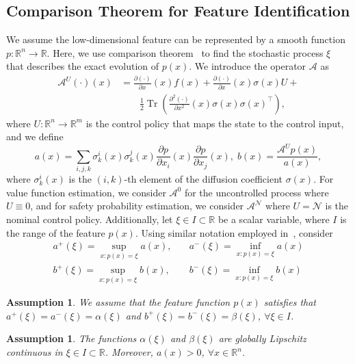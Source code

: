 \documentclass[letterpaper]{article} %
\newtheorem{assumption}[theorem]{Assumption}
\begin{document}
\subsection{Comparison Theorem for Feature Identification}
We assume the low-dimensional feature can be represented by a smooth function $p: \mathbb{R}^n \rightarrow \mathbb{R}$. Here, we use comparison theorem~\cite[Theorem 3.1]{ikeda1977comparison} to find the stochastic process $\xi$ that describes the exact evolution of $p(x)$.
We introduce the operator $\mathcal{A}$ as
\begin{equation}
\label{eq:def_L}
\begin{aligned}
\mathcal{A}^U(\cdot)(x) & =\frac{\partial(\cdot)}{\partial x}(x) f(x)+ \frac{\partial (\cdot)}{\partial x}(x) \sigma(x) U + \\
& \qquad \frac{1}{2} \operatorname{Tr}\left(\frac{\partial^2(\cdot)}{\partial x^2}(x) \sigma(x) \sigma(x)^\top\right),
\end{aligned}
\end{equation}
where $U: \mathbb{R}^n \rightarrow \mathbb{R}^m$ is the control policy that maps the state to the control input, and we define
\begin{equation}
    a(x)=\sum_{i, j, k} \sigma_k^i(x) \sigma_k^j(x) \frac{\partial p}{\partial x_i}(x) \frac{\partial p}{\partial x_j}(x), \; b(x)=\frac{\mathcal{A}^U p(x)}{a(x)},
\end{equation}
where $\sigma_k^i(x)$ is the $(i,k)$-th element of the diffusion coefficient $\sigma(x)$.
For value function estimation, we consider $\mathcal{A}^0$ for the uncontrolled process where $U \equiv 0$, and for safety probability estimation, we consider $\mathcal{A}^{\mathcal{N}}$ where $U = \mathcal{N}$ is the nominal control policy.
Additionally, let $\xi \in I \subset \mathbb{R}$ be a scalar variable, where $I$ is the range of the feature $p(x)$. Using similar notation employed in~\cite{ikeda1977comparison}, consider
\begin{equation}
\label{eq:a_b_def}
\begin{aligned}
    a^{+}(\xi) = \sup _{x: p(x)=\xi} a(x), & \quad a^{-}(\xi) = \inf _{x: p(x)=\xi} a(x) \\
    b^{+}(\xi)= \sup _{x: p(x)=\xi} b(x), & \quad b^{-}(\xi)=\inf _{x: p(x)=\xi} b(x)
\end{aligned}
\end{equation}
\begin{assumption}
\label{asm:match_upper_lower_bound}
We assume that the feature function $p(x)$ satisfies that $a^{+}(\xi) = a^{-}(\xi) = \alpha(\xi)$ and $b^{+}(\xi) = b^{-}(\xi) = \beta(\xi)$, $\forall \xi \in I$.
\end{assumption}
\begin{assumption}
\label{asm:continuity-condition-on-a-and-b}
The functions $\alpha(\xi)$ and $\beta(\xi)$ are globally Lipschitz continuous in $\xi \in I \subset \mathbb{R}$.
Moreover, $a(x) > 0$, $\forall x \in \mathbb{R}^{n}$.
\end{assumption}
\end{document}
